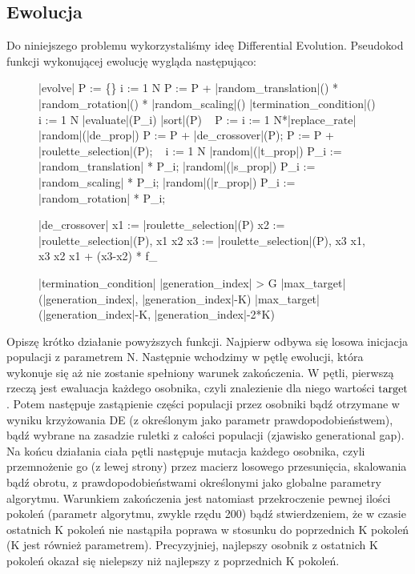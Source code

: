\documentclass[a4paper,12pt,leqno]{article}
\begin{document}
\subsection{Ewolucja}
Do niniejszego problemu wykorzystaliśmy ideę Differential Evolution. Pseudokod funkcji wykonującej ewolucję wygląda następująco:
\begin{figure}
\begin{program}
\FUNCT |evolve| \BODY
    P := \{\}
    \FOR i := 1 \TO N \DO
        P := P + |random_translation|() * |random_rotation|() * |random_scaling|()
    \END
    \WHILE \NOT |termination_condition|() \DO
        \FOR i := 1 \TO N \DO
            |evaluate|(P_i)
        \END
        |sort|(P) 
        ~
        P := 
        \FOR i := 1 \TO N*|replace_rate| \DO
            \IF |random|(|de_prop|)
                \THEN P := P + |de_crossover|(P);
                \ELSE P := P + |roulette_selection|(P); \FI
        \END
        ~
        \FOR i := 1 \TO N \DO 
            \IF |random|(|t_prop|)
	        \THEN P_i := |random_translation| * P_i; \FI
            \IF |random|(|s_prop|)
                \THEN P_i := |random_scaling| * P_i; \FI
            \IF |random|(|r_prop|)
                \THEN P_i := |random_rotation| * P_i; \FI
        \END
    \END
\END

\FUNCT |de_crossover| \BODY
    x1 := |roulette_selection|(P)
    x2 := |roulette_selection|(P),\; x1 \neq x2
    x3 := |roulette_selection|(P),\; x3 \neq x1,\; x3 \geq x2
    \RETURN x1 + (x3-x2) * f_
\END

\FUNCT |termination_condition| \BODY
    \RETURN |generation_index| > G \vee
            |max_target|(|generation_index|, |generation_index|-K) \geq
            |max_target|(|generation_index|-K, |generation_index|-2*K)
\END
\end{program}
\end{figure}

Opiszę krótko działanie powyższych funkcji. Najpierw odbywa się losowa inicjacja populacji z parametrem N. Następnie wchodzimy w pętlę ewolucji,
która wykonuje się aż nie zostanie spełniony warunek zakończenia.
W pętli, pierwszą rzeczą jest ewaluacja każdego osobnika, czyli znalezienie dla niego wartości $\mathrm{target}$. 
Potem następuje zastąpienie części populacji przez osobniki bądź otrzymane w wyniku krzyżowania DE (z określonym jako parametr prawdopodobieństwem),
bądź wybrane na zasadzie ruletki z całości populacji (zjawisko generational gap).
Na końcu działania ciała pętli następuje mutacja każdego osobnika, czyli przemnożenie go (z lewej strony) przez macierz losowego przesunięcia, 
skalowania bądź obrotu, z prawdopodobieństwami określonymi jako globalne parametry algorytmu.
Warunkiem zakończenia jest natomiast przekroczenie pewnej ilości pokoleń (parametr algorytmu, zwykle rzędu 200) bądź stwierdzeniem, 
że w czasie ostatnich K pokoleń nie nastąpiła poprawa w stosunku do poprzednich K pokoleń (K jest również parametrem). Precyzyjniej, najlepszy osobnik z ostatnich 
K pokoleń okazał się nielepszy niż najlepszy z poprzednich K pokoleń.
\end{document}
